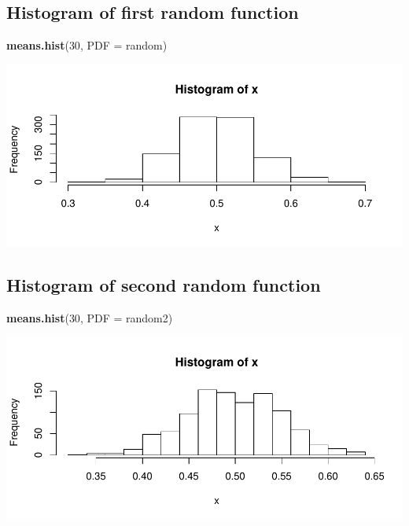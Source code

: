 \documentclass[]{article}
\newenvironment{Shaded}{\begin{snugshade}}{\end{snugshade}}
\newcommand{\KeywordTok}[1]{\textcolor[rgb]{0.13,0.29,0.53}{\textbf{{#1}}}}
\newcommand{\DataTypeTok}[1]{\textcolor[rgb]{0.13,0.29,0.53}{{#1}}}
\newcommand{\DecValTok}[1]{\textcolor[rgb]{0.00,0.00,0.81}{{#1}}}
\newcommand{\NormalTok}[1]{{#1}}
\begin{document}
\subsection{Histogram of first random
function}\label{histogram-of-first-random-function}

\begin{Shaded}
\begin{Highlighting}[]
\KeywordTok{means.hist}\NormalTok{(}\DecValTok{30}\NormalTok{, }\DataTypeTok{PDF =} \NormalTok{random)}
\end{Highlighting}
\end{Shaded}

\includegraphics{CHunt_Assign9_PS1_PS2_files/figure-latex/unnamed-chunk-6-1.pdf}

\subsection{Histogram of second random
function}\label{histogram-of-second-random-function}

\begin{Shaded}
\begin{Highlighting}[]
\KeywordTok{means.hist}\NormalTok{(}\DecValTok{30}\NormalTok{, }\DataTypeTok{PDF =} \NormalTok{random2)}
\end{Highlighting}
\end{Shaded}

\includegraphics{CHunt_Assign9_PS1_PS2_files/figure-latex/unnamed-chunk-7-1.pdf}
\newpage
\end{document}
